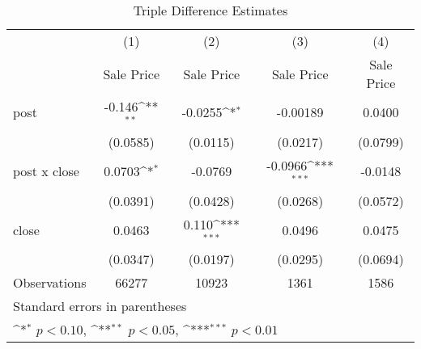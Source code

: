 \begin{table}[htbp]\centering
\def\sym#1{\ifmmode^{#1}\else\(^{#1}\)\fi}
\caption{Triple Difference Estimates\label{tabl}}
\begin{tabular}{l*{4}{c}}
\hline\hline
                    &\multicolumn{1}{c}{(1)}&\multicolumn{1}{c}{(2)}&\multicolumn{1}{c}{(3)}&\multicolumn{1}{c}{(4)}\\
                    &\multicolumn{1}{c}{Sale Price}&\multicolumn{1}{c}{Sale Price}&\multicolumn{1}{c}{Sale Price}&\multicolumn{1}{c}{Sale Price}\\
\hline
post                &      -0.146\sym{**} &     -0.0255\sym{*}  &    -0.00189         &      0.0400         \\
                    &    (0.0585)         &    (0.0115)         &    (0.0217)         &    (0.0799)         \\
[1em]
post x close        &      0.0703\sym{*}  &     -0.0769         &     -0.0966\sym{***}&     -0.0148         \\
                    &    (0.0391)         &    (0.0428)         &    (0.0268)         &    (0.0572)         \\
[1em]
close               &      0.0463         &       0.110\sym{***}&      0.0496         &      0.0475         \\
                    &    (0.0347)         &    (0.0197)         &    (0.0295)         &    (0.0694)         \\
\hline
Observations        &       66277         &       10923         &        1361         &        1586         \\
\hline\hline
\multicolumn{5}{l}{\footnotesize Standard errors in parentheses}\\
\multicolumn{5}{l}{\footnotesize \sym{*} \(p<0.10\), \sym{**} \(p<0.05\), \sym{***} \(p<0.01\)}\\
\end{tabular}
\end{table}
